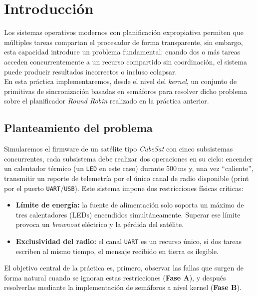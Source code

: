 \documentclass[12pt,letterpaper]{article}
\begin{document}


\newpage

\section*{Introducción}

Los sistemas operativos modernos con planificación expropiativa permiten que múltiples tareas compartan el procesador de forma transparente, sin embargo, esta capacidad introduce un problema fundamental: cuando dos o más tareas acceden concurrentemente a un recurso compartido sin coordinación, el sistema puede producir resultados incorrectos o incluso colapsar.\\

\noindent
En esta práctica implementaremos, desde el nivel del \textit{kernel}, un conjunto de primitivas de sincronización basadas en semáforos para resolver dicho problema sobre el planificador \textit{Round Robin} realizado en la práctica anterior.

\subsection*{Planteamiento del problema}

Simularemos el firmware de un satélite tipo \textit{CubeSat} con cinco subsistemas concurrentes, cada subsistema debe realizar dos operaciones en su ciclo: encender un calentador térmico (un \texttt{LED} en este caso) durante 500\,ms y, una vez ``caliente'', transmitir un reporte de telemetría por el único canal de radio disponible (print por el puerto \texttt{UART}/\texttt{USB}). Este sistema impone dos restricciones físicas críticas:

\begin{itemize}
\item \textbf{Límite de energía:} la fuente de alimentación solo soporta un máximo de tres calentadores (LEDs) encendidos simultáneamente. Superar ese límite provoca un \textit{brownout} eléctrico y la pérdida del satélite.
\item \textbf{Exclusividad del radio:} el canal \texttt{UART} es un recurso único, si dos tareas escriben al mismo tiempo, el mensaje recibido en tierra es ilegible.
\end{itemize}

El objetivo central de la práctica es, primero, observar las fallas que surgen de forma natural cuando se ignoran estas restricciones (\textbf{Fase A}), y después resolverlas mediante la implementación de semáforos a nivel kernel (\textbf{Fase B}).
\end{document}
